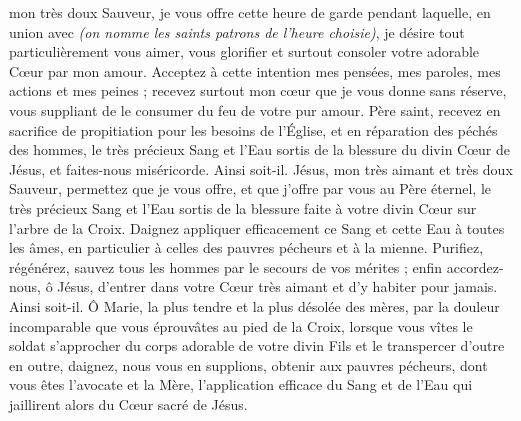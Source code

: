 \documentclass{bibliotheca-missel}
\begin{document}


 mon très doux Sauveur, je vous offre cette heure de garde pendant laquelle, en union avec \textit{(on nomme les saints patrons de l’heure choisie)}, je désire tout particulièrement vous aimer, vous glorifier et surtout consoler votre adorable Cœur par mon amour. Acceptez à cette intention mes pensées, mes paroles, mes actions et mes peines ; recevez surtout mon cœur que je vous donne sans réserve, vous suppliant de le consumer du feu de votre pur amour.
\priere Père saint, recevez en sacrifice de propitiation pour les besoins de l’Église, et en réparation des péchés des hommes, le très précieux Sang et l’Eau sortis de la blessure du divin Cœur de Jésus, et faites-nous miséricorde. Ainsi soit-il.
\priere Jésus, mon très aimant et très doux Sauveur, permettez que je vous offre, et que j’offre par vous au Père éternel, le très précieux Sang et l’Eau sortis de la blessure faite à votre divin Cœur sur l’arbre de la Croix. Daignez appliquer efficacement ce Sang et cette Eau à toutes les âmes, en particulier à celles des pauvres pécheurs et à la mienne. Purifiez, régénérez, sauvez tous les hommes par le secours de vos mérites ; enfin accordez-nous, ô Jésus, d’entrer dans votre Cœur très aimant et d’y habiter pour jamais. Ainsi soit-il.
\priere Ô Marie, la plus tendre et la plus désolée des mères, par la douleur incomparable que vous éprouvâtes au pied de la Croix, lorsque vous vîtes le soldat s’approcher du corps adorable de votre divin Fils et le transpercer d’outre en outre, daignez, nous vous en supplions, obtenir aux pauvres pécheurs, dont vous êtes l’avocate et la Mère, l’application efficace du Sang et de l’Eau qui jaillirent alors du Cœur sacré de Jésus.
\end{document}
